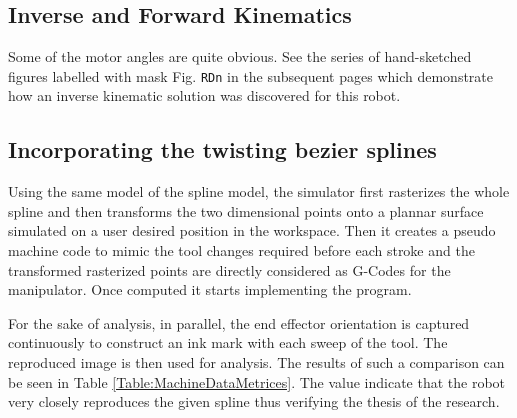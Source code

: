 {    \subsection{Inverse and Forward Kinematics}
    {
        Some of the motor angles are quite obvious. See the series of hand-sketched figures labelled with mask Fig. \texttt{RDn} in the subsequent pages which demonstrate how an inverse kinematic solution was discovered for this robot.
    }

    \subsection{Incorporating the twisting bezier splines} \label{Section:SimulatingRBS}
    {
        Using the same model of the spline model, the simulator first rasterizes the whole spline and then transforms the two dimensional points onto a plannar surface simulated on a user desired position in the workspace. Then it creates a pseudo machine code to mimic the tool changes required before each stroke and the transformed rasterized points are directly considered as G-Codes for the manipulator. Once computed it starts implementing the program.

        For the sake of analysis, in parallel, the end effector orientation is captured continuously to construct an ink mark with each sweep of the tool. The reproduced image is then used for analysis. The results of such a comparison can be seen in Table \ref{Table:MachineDataMetrices}. The value indicate that the robot very closely reproduces the given spline thus verifying the thesis of the research.

        \begin{table}[ht]
        \centering
        \caption{Benchmark of the mathematical accuracy of the twisting bezier spline curves with a simulated manipulator}
        \label{Table:MachineDataMetrices}
        \end{table}
    }
}
\clearpage 
